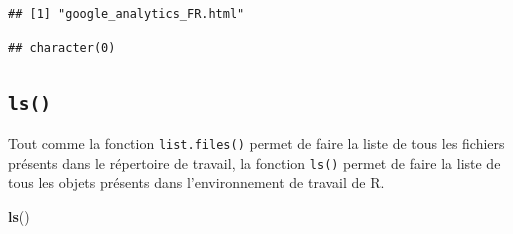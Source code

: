 \documentclass[
]{book}
\newenvironment{Shaded}{\begin{snugshade}}{\end{snugshade}}
\newcommand{\CommentTok}[1]{\textcolor[rgb]{0.56,0.35,0.01}{\textit{#1}}}
\newcommand{\DataTypeTok}[1]{\textcolor[rgb]{0.13,0.29,0.53}{#1}}
\newcommand{\KeywordTok}[1]{\textcolor[rgb]{0.13,0.29,0.53}{\textbf{#1}}}
\newcommand{\NormalTok}[1]{#1}
\newcommand{\StringTok}[1]{\textcolor[rgb]{0.31,0.60,0.02}{#1}}
\begin{document}
\begin{Shaded}
\end{Shaded}

\begin{verbatim}
## [1] "google_analytics_FR.html"
\end{verbatim}

\begin{Shaded}
\end{Shaded}

\begin{verbatim}
## character(0)
\end{verbatim}

\hypertarget{l015ls}{%
\subsection{\texorpdfstring{\texttt{ls()}}{ls()}}\label{l015ls}}

Tout comme la fonction \texttt{list.files()} permet de faire la liste de tous les fichiers présents dans le répertoire de travail, la fonction \texttt{ls()} permet de faire la liste de tous les objets présents dans l'environnement de travail de R.

\begin{Shaded}
\begin{Highlighting}[]
\KeywordTok{ls}\NormalTok{()}
\end{Highlighting}
\end{Shaded}
\end{document}
